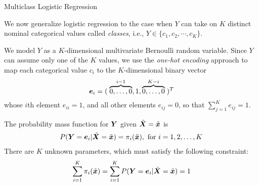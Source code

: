 \begin{frame}{Multiclass Logistic Regression}

We now generalize logistic regression to the case when 
$Y$ can take on $K$ distinct nominal categorical values called
{\em classes}, i.e., $Y \in \{c_1, c_2, \cdots, c_K\}$. 

\medskip

We model $Y$ as a $K$-dimensional
multivariate Bernoulli random variable. %
Since $Y$ can assume only one of
the $K$ values, we use the {\em one-hot encoding} approach to map each
categorical value $c_i$ to the $K$-dimensional binary vector 
$${\boldsymbol e}_i =
(\;\overbrace{0,\ldots,0}^{i-1},1,\overbrace{0,\ldots,0}^{K-i}\;)^T$$
whose $i$th element $e_{ii}=1$, and all other elements
$e_{ij} = 0$, so that $\sum_{j=1}^K e_{ij} = 1$.
%
\medskip

The probability mass function for ${\boldsymbol Y}$ given $\tilde{{\boldsymbol X}}=\tilde{{\boldsymbol x}}$ is
\begin{align*}
    P({\boldsymbol Y}={\boldsymbol e}_i|\tilde{{\boldsymbol X}} = \tilde{{\boldsymbol x}}) = \pi_i(\tilde{{\boldsymbol x}}), \text{ for } i=1,2,\ldots,K
\end{align*}
There are $K$ unknown parameters, which must satisfy the following
constraint:
\begin{align*}
    \sum^{K}_{i=1} \pi_i(\tilde{{\boldsymbol x}}) = \sum^{K}_{i=1} P({\boldsymbol Y}={\boldsymbol e}_i|\tilde{{\boldsymbol X}}=\tilde{{\boldsymbol x}}) = 1
\end{align*}
%

\end{frame}

